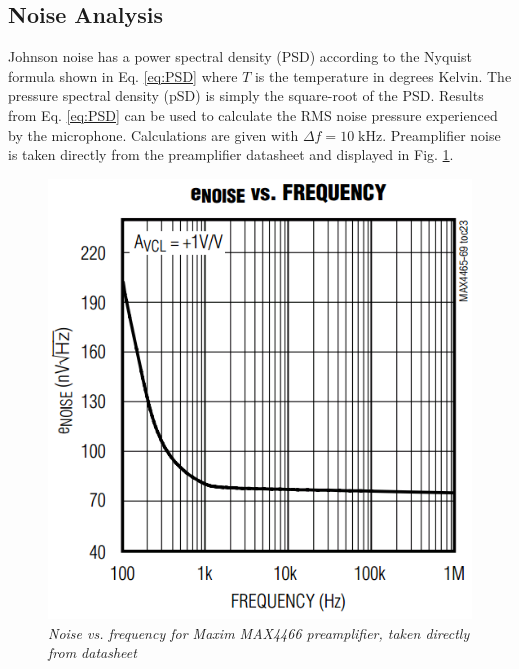 \documentclass[journal]{IEEEtran}
\begin{document}
\subsection{Noise Analysis}

Johnson noise has a power spectral density (PSD) according to the Nyquist formula shown in Eq. \ref{eq:PSD} where $T$ is the temperature in degrees Kelvin. The pressure spectral density (pSD) is simply the square-root of the PSD. Results from Eq. \ref{eq:PSD} can be used to calculate the RMS noise pressure experienced by the microphone. Calculations are given with $\Delta f = 10 \; \mathrm{kHz}$. Preamplifier noise is taken directly from the preamplifier datasheet and displayed in Fig. \ref{fig:PreampNoise}.

\begin{figure}[ht]
	\centering
	\includegraphics[scale=0.4]{PreampNoise.png}
	\caption{\em Noise vs. frequency for Maxim MAX4466 preamplifier, taken directly from datasheet\supercite{amp}}
	\label{fig:PreampNoise}
\end{figure}
\end{document}

